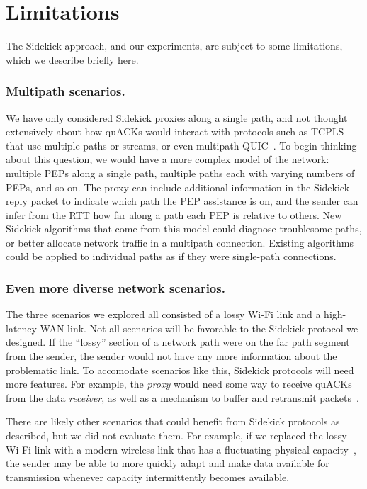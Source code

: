 \section{Limitations}
\label{sec:sidekick:limitations}

The Sidekick approach, and our experiments, are subject to some limitations,
which we describe briefly here.

\subsubsection{Multipath scenarios.}
We have only considered Sidekick proxies along a single path, and not thought
extensively about how quACKs would interact with protocols such as
\mbox{TCPLS}~\cite{rochet2020tcpls} that use multiple paths or streams,
or even multipath QUIC~\cite{de2017multipath}.
To begin thinking about this question, we would have a more complex model of the
network: multiple PEPs along a single path, multiple paths each with varying
numbers of PEPs, and so on. The proxy can include additional information in the
Sidekick-reply packet to indicate which path the PEP assistance is on, and the
sender can infer from the RTT how far along a path each PEP is relative to
others. New Sidekick algorithms that come from this model could diagnose
troublesome paths, or better allocate network traffic in a multipath
connection. Existing algorithms could be applied to individual paths as if they
were single-path connections.

\subsubsection{Even more diverse network scenarios.}
The three scenarios we explored all consisted of a lossy Wi-Fi link and a
high-latency WAN link. Not all scenarios will be favorable to the
Sidekick protocol we designed.
If the ``lossy'' section of a network path were on the far path segment from the
sender, the sender would not have any more information about the problematic
link. To accomodate scenarios like this, Sidekick protocols will need
more features. For example, the \emph{proxy} would need some way to receive
quACKs from the data \emph{receiver}, as well as a mechanism to buffer and
retransmit packets~\cite{balakrishnan1995snoop,caini2006pepsal}.

There are likely other scenarios that could benefit from Sidekick protocols as
described, but we did not evaluate them. For example, if we replaced the lossy
Wi-Fi link with a modern wireless link that has a fluctuating physical
capacity~\cite{niu2015survey,burchardt2014vlc,koenig2013wireless}, the sender
may be able to more quickly adapt and make data available for transmission
whenever capacity intermittently becomes available.

